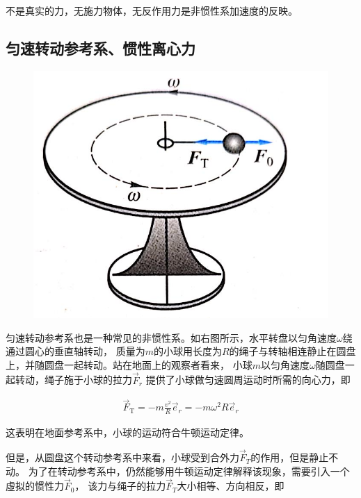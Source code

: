 \documentclass[12pt, a4paper]{article}
\numberwithin{equation}{section}
\begin{document}
    不是真实的力，无施力物体，无反作用力是非惯性系加速度的反映。

\subsection{匀速转动参考系、惯性离心力}
    
    \begin{figure}
        \centering
        \includegraphics[scale=0.2]{"Chapter 02 images/pic1.jpg"}
        \label{pic1}
    \end{figure}

    匀速转动参考系也是一种常见的非惯性系。如右图所示，水平转盘以匀角速度\(\omega\)绕通过圆心的垂直轴转动，
    质量为\(m\)的小球用长度为\(R\)的绳子与转轴相连静止在圆盘上，并随圆盘一起转动。站在地面上的观察者看来，
    小球\(m\)以匀角速度\(\omega\)随圆盘一起转动，绳子施于小球的拉力\(\overrightarrow{F}_{r}\)
    提供了小球做匀速圆周运动时所需的向心力，即

    \begin{align}
        \overrightarrow{F}_{\mathrm{T}}=-m \frac{v^2}{R} \overrightarrow{e}_r=-m \omega^2 R \overrightarrow{e}_r
    \end{align}

    这表明在地面参考系中，小球的运动符合牛顿运动定律。

    但是，从圆盘这个转动参考系中来看，小球受到合外力\(\overrightarrow{F}_{T}\)的作用，但是静止不动。
    为了在转动参考系中，仍然能够用牛顿运动定律解释该现象，需要引入一个虛拟的惯性力\(\overrightarrow{F}_{0}\)，
    该力与绳子的拉力\(\overrightarrow{F}_{T}\)大小相等、方向相反，即
\end{document}
